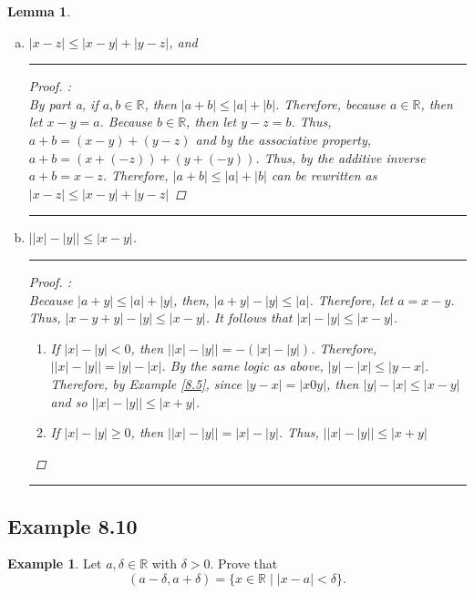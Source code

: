 \documentclass[openany, amssymb, psamsfonts]{amsart}
\newcommand{\bbR}{\mathbb{R}}
\newcommand{\abs}[1]{\lvert #1 \rvert}
\newtheorem{lem}{Lemma}[section]
\theoremstyle{definition}
\newtheorem{exmp}{Example}[section]
\numberwithin{equation}{section}
\begin{document}
\begin{lem}
\begin{enumerate}[(a)]
\begin{proof}
\end{proof} \vspace{4pt}     \hrule   \vspace{4pt}
		\item \quad $\abs{x - z} \leq \abs{x - y} + \abs{y - z}$, and
\vspace{4pt}     \hrule   \vspace{4pt}
\begin{proof} :\\
By part a, if $a,b\in \bbR$, then $\abs{a+b}\leq \abs{a}+\abs{b}$. Therefore, because $a\in \bbR$, then let $x-y = a$. Because $b\in \bbR$, then let $y-z = b$. Thus, $a+b = (x-y) + (y-z)$ and by the associative property, $a+b = (x+(-z)) + (y+(-y))$. Thus, by the additive inverse $a+b = x-z$. Therefore, $\abs{a+b}\leq \abs{a}+\abs{b}$ can be rewritten as  $\abs{x-z}\leq \abs{x-y}+\abs{y-z}$
\end{proof} \vspace{4pt}     \hrule   \vspace{4pt}
		\item \quad $\abs{\abs{x} - \abs{y}} \leq \abs{x-y}$.
\vspace{4pt}     \hrule   \vspace{4pt}
\begin{proof} :\\
Because $\abs{a+y} \leq \abs{a}+\abs{y}$, then, $\abs{a+y} - \abs{y} \leq \abs{a}$. Therefore, let $a= x-y$. Thus, $\abs{x-y+y} - \abs{y} \leq \abs{x-y}$. It follows that $\abs{x} - \abs{y} \leq \abs{x-y}$.
\begin{enumerate}
    \item If $\abs{x} - \abs{y} <0$, then  $\abs{\abs{x} - \abs{y}} = -(\abs{x} - \abs{y})$. Therefore, $\abs{\abs{x} - \abs{y}} = \abs{y}-\abs{x}$. By the same logic as above, $\abs{y}-\abs{x} \leq \abs{y-x}$. Therefore, by Example \ref{8.5}, since $\abs{y-x}=\abs{x0y}$, then $\abs{y}-\abs{x} \leq \abs{x-y}$ and so $\abs{\abs{x} - \abs{y}}\leq \abs{x+y}$.
    \item If $\abs{x} - \abs{y} \geq 0$, then $\abs{\abs{x} - \abs{y}} = \abs{x} - \abs{y}$. Thus, $\abs{\abs{x} - \abs{y}}\leq \abs{x+y}$
\end{enumerate}

\end{proof} \vspace{4pt}     \hrule   \vspace{4pt}
	\end{enumerate}
\end{lem}
\subsection*{Example 8.10}
\begin{exmp}
\label{8.10}
	Let $a, \delta \in \bbR$ with $\delta > 0$. Prove that
	\[
	(a - \delta, a + \delta) = \{x \in \mathbb{R} \mid \abs{x - a} < \delta \}.
	\]
\end{exmp}
\end{document}
